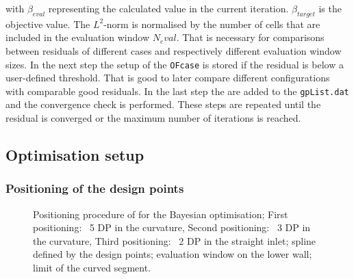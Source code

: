 with $\beta_{eval}$ representing the calculated value in the current iteration.
$\beta_{target}$ is the objective value. 
The $L^2$-norm is normalised by the number of cells that are included in the evaluation window $N_eval$.
That is necessary for comparisons between residuals of different cases and respectively different evaluation window sizes.
In the next step the setup of the \texttt{OFcase} is stored if the residual is below a user-defined threshold.
That is good to later compare different configurations with comparable good residuals.
In the last step the  are added to the \texttt{gpList.dat} and the convergence check is performed.
These steps are repeated until the residual is converged or the maximum number of iterations is reached.

\subsection{Optimisation setup}

\subsubsection{Positioning of the design points}

\begin{figure}[H]
    \centering
    
    \caption[Positioning procedure of  for the Bayesian optimisation]{Positioning procedure of  for the Bayesian optimisation;
    First positioning: ~5 DP in the curvature,
    Second positioning: ~3 DP in the curvature,
    Third positioning: ~2 DP in the straight inlet;
     spline defined by the design points;
     evaluation window on the lower wall;
     limit of the curved segment.
    }
    \label{fig:OF_designPOints}
\end{figure}


